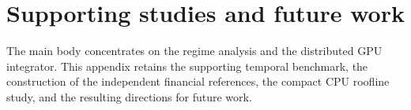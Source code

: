 \section{Supporting studies and future work}\label{app:supporting}

The main body concentrates on the regime analysis and the distributed GPU
integrator. This appendix retains the supporting temporal benchmark, the
construction of the independent financial references, the compact CPU
roofline study, and the resulting directions for future work.





